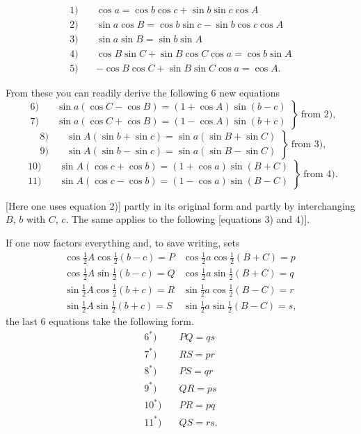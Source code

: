 \[
\begin{aligned}
1) \quad & \cos a = \cos b \cos c + \sin b \sin c \cos A \\
2) \quad & \sin a \cos B = \cos b \sin c - \sin b \cos c \cos A \\
3) \quad & \sin a \sin B = \sin b \sin A \\
4) \quad & \cos B \sin C + \sin B \cos C \cos a = \cos b \sin A \\
5) \quad & -\cos B \cos C + \sin B \sin C \cos a = \cos A.
\end{aligned}
\]

From these you can readily derive the following 6 new equations
\[
\left.\begin{aligned}
6) \quad & \sin a(\cos C - \cos B) = (1+\cos A)\sin(b-c) \\
7) \quad & \sin a(\cos C + \cos B) = (1-\cos A)\sin(b+c)
\end{aligned}\right\}\ \text{from 2),}
\]
\[
\left.\begin{aligned}
8) \quad & \sin A(\sin b + \sin c) = \sin a(\sin B + \sin C) \\
9) \quad & \sin A(\sin b - \sin c) = \sin a(\sin B - \sin C)
\end{aligned}\right\}\ \text{from 3),}
\]
\[
\left.\begin{aligned}
10) \quad & \sin A(\cos c + \cos b) = (1+\cos a)\sin(B+C) \\
11) \quad & \sin A(\cos c - \cos b) = (1-\cos a)\sin(B-C)
\end{aligned}\right\}\ \text{from 4).}
\]

[Here one uses equation 2)] partly in its original form
and partly by interchanging $B$, $b$ with $C$, $c$. The same applies to the
following [equations 3) and 4)].

If one now factors everything and, to save
writing, sets
\[
\begin{array}{ll}
\cos \tfrac12 A \cos \tfrac12 (b-c) = P & \cos \tfrac12 a \cos \tfrac12 (B+C) = p \\[4pt]
\cos \tfrac12 A \sin \tfrac12 (b-c) = Q & \cos \tfrac12 a \sin \tfrac12 (B+C) = q \\[4pt]
\sin \tfrac12 A \cos \tfrac12 (b+c) = R & \sin \tfrac12 a \cos \tfrac12 (B-C) = r \\[4pt]
\sin \tfrac12 A \sin \tfrac12 (b+c) = S & \sin \tfrac12 a \sin \tfrac12 (B-C) = s,
\end{array}
\]
the last 6 equations take the following form.
\[
\begin{aligned}
6^\ast) \quad & PQ = qs \\
7^\ast) \quad & RS = pr \\
8^\ast) \quad & PS = qr \\
9^\ast) \quad & QR = ps \\
10^\ast) \quad & PR = pq \\
11^\ast) \quad & QS = rs.
\end{aligned}
\]
